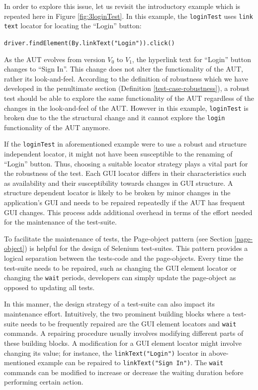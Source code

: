 In order to explore this issue, let us revisit the introductory example which is repeated here in Figure \ref{fig:3loginTest}. In this example, the \texttt{loginTest} uses \texttt{link text} locator for locating the ``Login'' button: \begin{small}
\texttt{driver.findElement(By.linkText("Login")).click()}
\end{small}
As the AUT evolves from version $V_{0}$ to $V_{1}$, the hyperlink text for ``Login'' button changes to ``Sign In''. This change does not alter the functionality of the AUT, rather its look-and-feel. According to the definition of robustness which we have developed in the penultimate section (Definition \ref{test-case-robustness}), a robust test should be able to explore the same functionality of the AUT regardless of the changes in the look-and-feel of the AUT. However in this example, \texttt{loginTest} is broken due to the the structural change and it cannot explore the \texttt{login} functionality of the AUT anymore. 

If the \texttt{loginTest} in aforementioned example were to use a robust and structure independent locator, it might not have been susceptible to the renaming of ``Login'' button. Thus, choosing a suitable locator strategy plays a vital part for the robustness of the test. Each GUI locator differs in their characteristics such as availability and their susceptibility towards changes in GUI structure. A structure dependent locator is likely to be broken by minor changes in the application's GUI and needs to be repaired repeatedly if the AUT has frequent GUI changes. This process adds additional overhead in terms of the effort needed for the maintenance of the test-suite.  

To facilitate the maintenance of tests, the Page-object pattern (see Section \ref{page-object}) is helpful for the design of Selenium test-suites. This pattern provides a logical separation between the tests-code and the page-objects. Every time the test-suite needs to be repaired, such as changing the GUI element locator or changing the \texttt{wait} periods, developers can simply update the page-object as opposed to updating all tests. 

In this manner, the design strategy of a test-suite can also impact its maintenance effort. Intuitively, the two prominent building blocks where a test-suite needs to be frequently repaired are the GUI element locators and \texttt{wait} commands. A repairing procedure usually involves modifying different parts of these building blocks. A modification for a GUI element locator might involve changing its value; for instance, the \texttt{linkText("Login")} locator in above-mentioned example can be repaired to \texttt{linkText("Sign In")}. The \texttt{wait} commands can be modified to increase or decrease the waiting duration before performing certain action.

